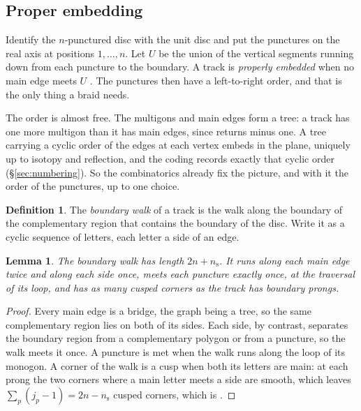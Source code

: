 \documentclass[12pt]{amsart}
\newcommand{\np}{n}                       %
\theoremstyle{plain}
\newtheorem{Lemma}[Theorem]{Lemma}
\theoremstyle{definition}
\newtheorem{Definition}[Theorem]{Definition}
\begin{document}
\subsection{Proper embedding}
Identify the $\np$-punctured disc with the unit disc and put the
punctures on the real axis at positions $1,\dots,\np$.  Let $U$ be the union of the vertical
segments running down from each puncture to the boundary.  A track is
\emph{properly embedded} when no main edge meets $U$ \cite{Song2002,
Lanneau2011}.  The punctures then have a left-to-right order, and that is
the only thing a braid needs.

The order is almost free.  The multigons and main edges form a tree: a
track has one more multigon than it has main edges, since
 returns  minus one.  A tree carrying
a cyclic order of the edges at each vertex embeds in the plane, uniquely
up to isotopy and reflection, and the coding records exactly that cyclic
order (\S\ref{sec:numbering}).  So the combinatorics already fix the
picture, and with it the order of the punctures, up to one choice.

\begin{Definition}
The \emph{boundary walk} of a track is the walk along the boundary of the
complementary region that contains the boundary of the disc.  Write it as a
cyclic sequence of letters, each letter a side of an edge.
\end{Definition}

\begin{Lemma}
\label{lem:walk}
The boundary walk has length $2n + n_{\mathrm{s}}$.  It runs along each
main edge twice and along each side once, meets each puncture exactly
once, at the traversal of its loop, and has as many cusped corners as the
track has boundary prongs.
\end{Lemma}

\begin{proof}
Every main edge is a bridge, the graph being a tree, so the same
complementary region lies on both of its sides.  Each side, by contrast,
separates the boundary region from a complementary polygon or from a
puncture, so the walk meets it once.  A puncture is met when the walk
runs along the loop of its monogon.  A corner of the walk is a cusp when
both its letters are main: at each prong the two corners where a main
letter meets a side are smooth, which leaves $\sum_p (j_p - 1) = 2n -
n_{\mathrm{s}}$ cusped corners, which is .
\end{proof}
\end{document}
